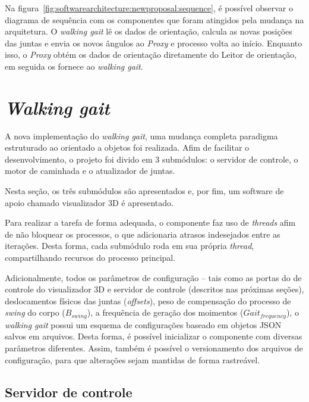 Na figura~\ref{fig:softwarearchitecture:newproposal:sequence}, é possível observar o diagrama de sequência com os componentes que foram atingidos pela mudança na arquitetura. O \textit{walking gait} lê os dados de orientação, calcula as novas posições das juntas e envia os novos ângulos ao \textit{Proxy} e processo volta ao início. Enquanto isso, o \textit{Proxy} obtém os dados de orientação diretamente do Leitor de orientação, em seguida os fornece ao \textit{walking gait}.

\section{\textit{Walking gait}}

A nova implementação do \textit{walking gait}, uma mudança completa paradigma estruturado ao orientado a objetos foi realizada. Afim de facilitar o desenvolvimento, o projeto foi divido em $3$ submódulos: o servidor de controle, o motor de caminhada e o atualizador de juntas.

Nesta seção, os três submódulos são apresentados e,  por fim, um software de apoio chamado visualizador 3D é apresentado.

Para realizar a tarefa de forma adequada, o componente faz uso de \textit{threads} afim de não bloquear os processos, o que adicionaria atrasos indesejados entre as iterações. Desta forma, cada submódulo roda em sua própria \textit{thread}, compartilhando recursos do processo principal.

Adicionalmente, todos os parâmetros de configuração -- tais como as portas do de controle do visualizador 3D e servidor de controle (descritos nas próximas seções), deslocamentos físicos das juntas (\textit{offsets}), peso de compensação do processo de  \textit{swing} do corpo ($B_{swing}$), a frequência de geração dos moimentos ($Gait_{frequency}$), o \textit{walking gait} possui um esquema de configurações baseado em objetos JSON salvos em arquivos. Desta forma, é possível inicializar o componente com diversas parâmetros diferentes. Assim, também é possível o versionamento dos arquivos de configuração, para que alterações sejam mantidas de forma rastreável.

\subsection{Servidor de controle}
\label{subsec:architecture:walkinggait:controlserver}

